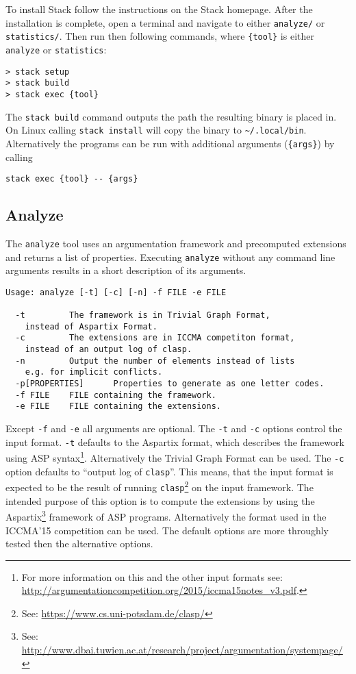 \documentclass[parskip=half]{scrartcl}
\begin{document}
To install Stack follow the instructions on the Stack homepage.  After the
installation is complete, open a terminal and navigate to either
\texttt{analyze/} or \texttt{statistics/}. Then run then following commands,
where \texttt{\{tool\}} is either \texttt{analyze} or \texttt{statistics}:
\begin{verbatim}
> stack setup
> stack build
> stack exec {tool}
\end{verbatim}

The \texttt{stack build} command outputs the path the resulting binary is placed
in. On Linux calling \texttt{stack install} will copy the binary to
\texttt{\~{}/.local/bin}. Alternatively the programs can be run with additional
arguments (\texttt{\{args\}}) by calling
\begin{verbatim}
stack exec {tool} -- {args}
\end{verbatim}

\subsection{Analyze}

The \texttt{analyze} tool uses an argumentation framework and precomputed
extensions and returns a list of properties. Executing \texttt{analyze} without
any command line arguments results in a short description of its arguments.

\begin{verbatim}
Usage: analyze [-t] [-c] [-n] -f FILE -e FILE

  -t         The framework is in Trivial Graph Format,
    instead of Aspartix Format.
  -c         The extensions are in ICCMA competiton format,
    instead of an output log of clasp.
  -n         Output the number of elements instead of lists
    e.g. for implicit conflicts.
  -p[PROPERTIES]      Properties to generate as one letter codes.
  -f FILE    FILE containing the framework.
  -e FILE    FILE containing the extensions.
\end{verbatim}

Except \texttt{-f} and \texttt{-e} all arguments are optional.  The \texttt{-t}
and \texttt{-c} options control the input format. \texttt{-t} defaults to the
Aspartix format, which describes the framework using ASP syntax\footnote{For
    more information on this and the other input formats see:
\url{http://argumentationcompetition.org/2015/iccma15notes_v3.pdf}.}.
Alternatively the Trivial Graph Format can be used. The \texttt{-c} option
defaults to ``output log of \texttt{clasp}''. This means, that the input format
is expected to be the result of running \texttt{clasp}\footnote{See:
\url{https://www.cs.uni-potsdam.de/clasp/}} on the input framework. The intended
purpose of this option is to compute the extensions by using the
Aspartix\footnote{See:
\url{http://www.dbai.tuwien.ac.at/research/project/argumentation/systempage/}}
framework of ASP programs. Alternatively the format used in the ICCMA'15
competition can be used. The default options are more throughly tested then the
alternative options.
\end{document}
